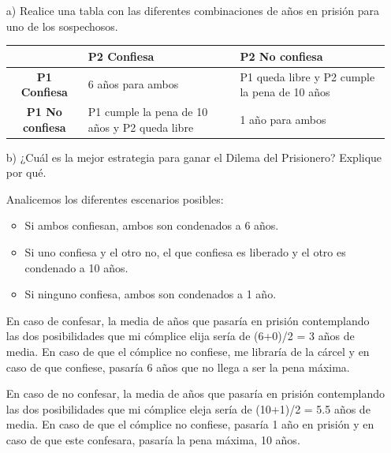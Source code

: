 \documentclass{llncs}
\begin{document}
\begin{enumerate}
	\vspace{0.5cm}
	\item [a)] Realice una tabla con las diferentes combinaciones de años en prisión para uno de los sospechosos.

		\begin{center}
			\begin{tabular}{|c|p{5cm}|p{5cm}|}
				\hline
				& \textbf{P2 Confiesa} & \textbf{P2 No confiesa} \\
				\hline
				\textbf{P1 Confiesa} & 6 años para ambos & P1 queda libre y P2 cumple la pena de 10 años \\
				\hline
				\textbf{P1 No confiesa} & P1 cumple la pena de 10 años y P2 queda libre & 1 año para ambos\\
				\hline
			\end{tabular}
		\end{center}


	\vspace{0.5cm}
	\item [b)] ¿Cuál es la mejor estrategia para ganar el Dilema del Prisionero? Explique por qué.

		\vspace{0.25cm}
		Analicemos los diferentes escenarios posibles:

		\begin{itemize}
			\item Si ambos confiesan, ambos son condenados a 6 años.
			\item Si uno confiesa y el otro no, el que confiesa es liberado y el otro es condenado a 10 años.
			\item Si ninguno confiesa, ambos son condenados a 1 año.
		\end{itemize}

		En caso de confesar, la media de años que pasaría en prisión contemplando las dos posibilidades que mi cómplice elija sería de (6+0)/2 = 3 años de media. En caso de que el cómplice no confiese, me libraría de la cárcel y en caso de que confiese, pasaría 6 años que no llega a ser la pena máxima.

		\vspace{0.25cm}
		En caso de no confesar, la media de años que pasaría en prisión contemplando las dos posibilidades que mi cómplice eleja sería de (10+1)/2 = 5.5 años de media. En caso de que el cómplice no confiese, pasaría 1 año en prisión y en caso de que este confesara, pasaría la pena máxima, 10 años.


\end{enumerate}
\end{document}

